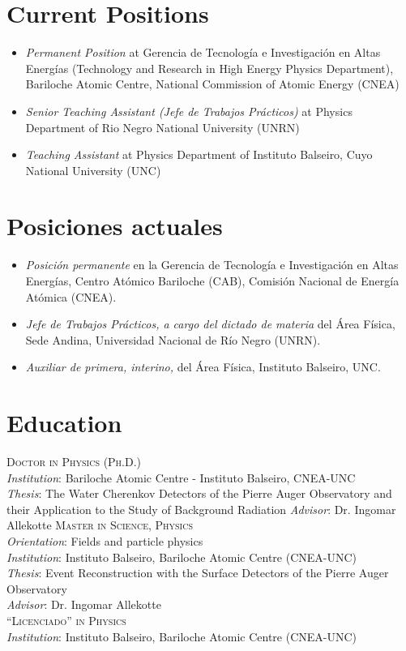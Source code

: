 \ifeng
\section*{Current Positions}
\begin{itemize}
\item \emph{Permanent Position} at Gerencia de Tecnología e Investigación en Altas Energías (Technology and Research in High Energy Physics Department), Bariloche Atomic Centre, National Commission of Atomic Energy (CNEA)
\item \emph{Senior Teaching Assistant (Jefe de Trabajos Prácticos)} at Physics Department of Rio Negro National University (UNRN)
\item \emph{Teaching Assistant} at Physics Department of Instituto Balseiro, Cuyo National University (UNC)
\end{itemize}
\else
\section*{Posiciones actuales}
\begin{itemize}
\item \emph{Posición permanente} en la Gerencia de Tecnología e Investigación en Altas Energías, Centro Atómico Bariloche (CAB), Comisión Nacional de Energía Atómica (CNEA).\\
\item \emph{Jefe de Trabajos Prácticos, a cargo del dictado de materia} del Área Física, Sede Andina, Universidad Nacional de Río Negro (UNRN).\\
\item \emph{Auxiliar de primera, interino,} del Área Física, Instituto Balseiro, UNC.\\
\end{itemize}
\fi

\ifeng
\section*{Education}
\noindent
{}\textsc{Doctor in Physics (Ph.D.)}\\
{\emph{Institution}}: Bariloche Atomic Centre - Instituto Balseiro, CNEA-UNC\\
{\emph{Thesis}}: The Water Cherenkov Detectors of the Pierre Auger Observatory and their Application to the Study of Background Radiation
{\emph{Advisor}}: Dr. Ingomar Allekotte 
\textsc{Master in Science, Physics}\\
{\emph{Orientation}}: Fields and particle physics\\
{\emph{Institution}}: Instituto Balseiro, Bariloche Atomic Centre (CNEA-UNC)\\
{\emph{Thesis}}: Event Reconstruction with the Surface Detectors of the Pierre
Auger Observatory\\
{\emph{Advisor}}: Dr. Ingomar Allekotte\\ 
\textsc{``Licenciado'' in Physics}\\
{\emph{Institution}}: Instituto Balseiro, Bariloche Atomic Centre (CNEA-UNC)\\
\else
